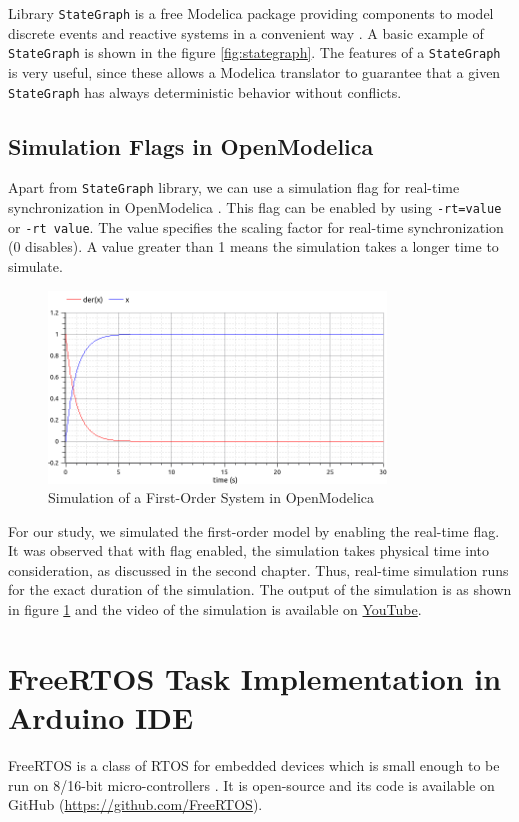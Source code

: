 \documentclass[12pt]{report}
\begin{document}
Library \texttt{StateGraph} is a free Modelica package providing components to model discrete events and reactive systems in a convenient way \cite{stategraph}. A basic example of \texttt{StateGraph} is shown in the figure \ref{fig:stategraph}.  The features of a \texttt{StateGraph} is very useful, since these allows a Modelica translator to guarantee that a given \texttt{StateGraph} has always deterministic behavior without conflicts. 

\subsection{Simulation Flags in OpenModelica}
Apart from \texttt{StateGraph} library, we can use a simulation flag \cite{flags} for real-time synchronization in OpenModelica . This flag can be enabled by using \texttt{-rt=value} or \texttt{-rt value}. The value specifies the scaling factor for real-time synchronization (0 disables). A value greater than 1 means the simulation takes a longer time to simulate. 
\begin{figure}[h]
\centering
\includegraphics[width=0.8\textwidth]{images/flag.png}
\caption{Simulation of a First-Order System in OpenModelica}
\label{fig:first-order-rt}
\end{figure}
For our study, we simulated the first-order model by enabling the real-time flag. It was observed that with flag enabled, the simulation takes physical time into consideration, as discussed in the second chapter. Thus, real-time simulation runs for the exact duration of the simulation. The output of the simulation is as shown in figure \ref{fig:first-order-rt} and the video of the simulation is available on \href{https://youtu.be/s2oELiNWK40}{YouTube}.


\section{FreeRTOS Task Implementation in Arduino IDE}
FreeRTOS is a class of RTOS for embedded devices which is small enough to be run on 8/16-bit micro-controllers \cite{freertos}. It is open-source and its code is available on GitHub (\url{https://github.com/FreeRTOS}).\\
\end{document}
